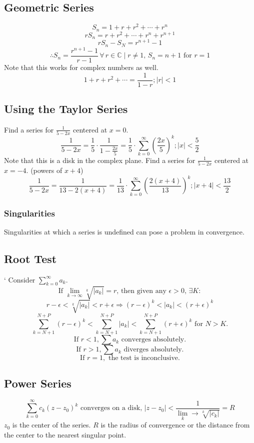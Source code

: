 \documentclass[../main.tex]{subfiles}
\begin{document}
    \subsection{Geometric Series}
            $$S_{n}=1+r+r^{2}+\cdots+r^{n}$$
            $$rS_{n}=r+r^{2}+\cdots+r^{n}+r^{n+1}$$
            $$rS_{n}-S_{N}=r^{n+1}-1$$
            $$\therefore S_{n}=\frac{r^{n+1}-1}{r-1} \,\forall\, r\in\mathbb{C} \mid r\neq1\text{, }S_{n}=n+1\text{ for } r=1$$
            Note that this works for complex numbers as well.
            $$1+r+r^{2}+\cdots=\frac{1}{1-r}; |r|<1$$
    
    \subsection{Using the Taylor Series}
        Find a series for $\frac{1}{5-2x}$ centered at $x=0$.
        $$\frac{1}{5-2x}=\frac{1}{5}\cdot\frac{1}{1-\frac{2x}{5}}=\frac{1}{5}\cdot\sum_{k=0}^{\infty}\left(\frac{2x}{5}\right)^{k};|x|<\frac{5}{2}$$
        Note that this is a disk in the complex plane.
        Find a series for $\frac{1}{5-2x}$ centered at $x=-4$. (powers of $x+4$)
        $$\frac{1}{5-2x}=\frac{1}{13-2(x+4)}=\frac{1}{13}\cdot\sum_{k=0}^{\infty}\left(\frac{2(x+4)}{13}\right)^{k};|x+4|<\frac{13}{2}$$

        \subsubsection{Singularities}
            Singularities at which a series is undefined can pose a problem in convergence.
    
    \subsection{Root Test}        
`       Consider $\sum_{k=0}^{\infty}a_{k}$.
        $$\text{If } \lim_{k\rightarrow\infty}\sqrt[k]{|a_{k}|}=r\text{, then given any }\epsilon > 0\text{, }\exists K:$$
        $$r-\epsilon < \sqrt[k]{|a_{k}|}<r+\epsilon\Rightarrow(r-\epsilon)^{k} < |a_{k}|<(r+\epsilon)^{k}$$
        $$\sum_{k=N+1}^{N+P}(r-\epsilon)^{k} < \sum_{k=N+1}^{N+P}|a_{k}|<\sum_{k=N+1}^{N+P}(r+\epsilon)^{k} \text{ for } N>K \text{.}$$
        $$\text{ If } r < 1, \sum a_{k} \text{ converges absolutely. }$$
        $$\text{ If } r > 1, \sum a_{k} \text{ diverges absolutely. }$$
        $$\text{ If } r = 1, \text{ the test is inconclusive. }$$

    \subsection{Power Series}
        $$\sum_{k=0}^{\infty}c_{k}(z-z_{0})^{k}\text{ converges on a disk, } |z-z_{0}|<\frac{1}{\lim_k\rightarrow\sqrt[k]{|c_{k}|}}=R$$
        $z_{0}$ is the center of the series. $R$ is the radius of convergence or the distance from the center to the nearest singular point.
        
\end{document}

